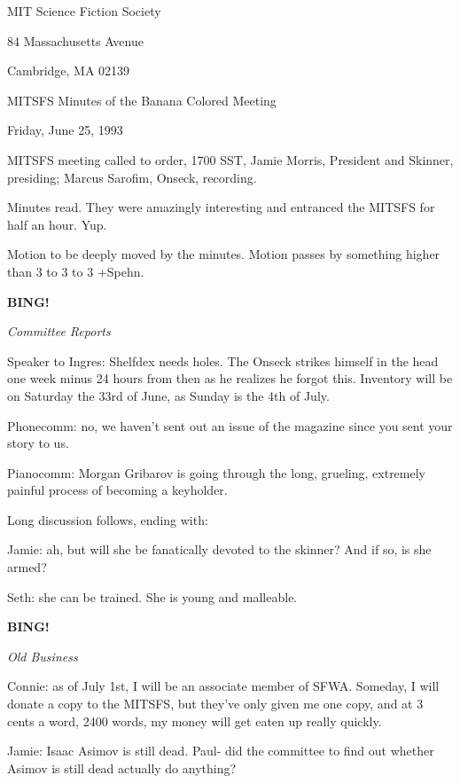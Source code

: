 \documentclass[12pt]{article}
\newcommand{\bing}{{\bf BING!} }
\newcommand{\goto}[1]{\bing \vskip 12pt \centerline{{\em{#1}}}}
\begin{document}
\begin{center}

MIT Science Fiction Society 

84 Massachusetts Avenue

Cambridge, MA 02139

\vspace{12pt}

MITSFS Minutes of the Banana Colored Meeting 

Friday, June 25, 1993

\end{center}
 
\vspace{18pt}

\setlength{\parskip}{6pt}

\noindent
MITSFS meeting called to order, 1700 SST,
Jamie Morris, President and Skinner, presiding; Marcus Sarofim, Onseck, recording.

Minutes read. They were amazingly interesting and entranced the MITSFS for half an hour. Yup.

Motion to be deeply moved by the minutes. Motion passes by something higher than 3 to 3 to 3 +Spehn.

\goto{Committee Reports}

Speaker to Ingres: Shelfdex needs holes. The Onseck strikes himself in the head one week minus 24 hours from then as he realizes he forgot this. Inventory will be on Saturday the 33rd of June, as Sunday is the 4th of July.

Phonecomm: no, we haven't sent out an issue of the magazine since you sent your story to us.

Pianocomm: Morgan Gribarov is going through the long, grueling, extremely painful process of becoming a keyholder.

Long discussion follows, ending with:

Jamie: ah, but will she be fanatically devoted to the skinner? And if so, is she armed?

Seth: she can be trained. She is young and malleable.

\goto{Old Business}

Connie: as of July 1st, I will be an associate member of SFWA. Someday, I will donate a copy to the MITSFS, but they've only given me one copy, and at 3 cents a word, 2400 words, my money will get eaten up really quickly.

Jamie: Isaac Asimov is still dead. Paul- did the committee to find out whether Asimov is still dead actually do anything?
\end{document}
